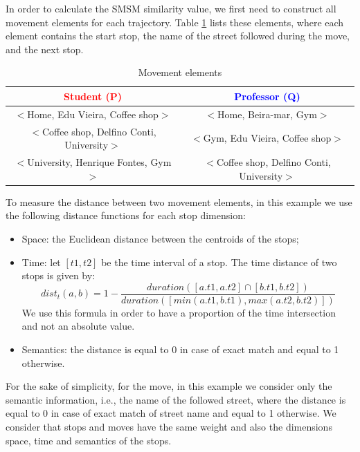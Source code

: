 In order to calculate the SMSM similarity value, we first need to construct all movement elements for each trajectory. Table \ref{tab:SMSM_tuples} lists these elements, where each element contains the start stop, the name of the street followed during the move, and the next stop. 

\begin{table}[h!]
\scriptsize
  \centering
  \begin{tabular}{|c|c|}
  	\hline
		\textcolor{Red}{\textbf{Student (P)}} & \textcolor{Blue}{\textbf{Professor (Q)}}\\
  	\hline
      $<$Home, Edu Vieira, Coffee shop$>$&$<$Home, Beira-mar, Gym$>$\\
      $<$Coffee shop, Delfino Conti, University$>$&$<$Gym, Edu Vieira, Coffee shop$>$\\
      $<$University, Henrique Fontes, Gym$>$&$<$Coffee shop, Delfino Conti, University$>$\\
  	\hline
  \end{tabular}
  \label{tab:wrong}
  \caption{Movement elements}
  \label{tab:SMSM_tuples}
\end{table}

To measure the distance between two movement elements, in this example we use the following distance functions for each stop dimension:
\begin{itemize}
  \item Space: the Euclidean distance between the centroids of the stops;
      \item  Time:  {let $[t1, t2]$ be the time interval of a stop. The time distance of two stops is given by:}
\begin{equation} \label{func:time_interval}
	dist_t(a, b) = 1 - \dfrac{duration([a.t1, a.t2] \cap [b.t1, b.t2])}{duration([min(a.t1, b.t1), max(a.t2, b.t2)])}
\end{equation}
{We use this formula in order to have a proportion of the time intersection and not an absolute value.}
  \item Semantics: the distance is equal to 0 in case of exact match and equal to 1 otherwise.
\end{itemize}

For the sake of simplicity, for the move, in this example we consider only the semantic information, i.e., the name of the followed street, where the distance is equal to 0 in case of exact match of street name and equal to 1 otherwise.
We consider that stops and moves have the same weight and also the dimensions space, time and semantics of the stops.

